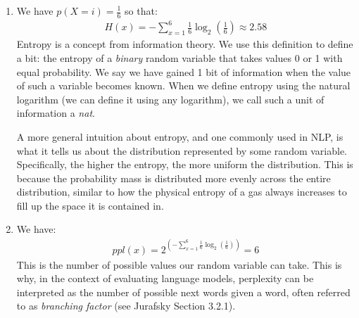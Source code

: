 \documentclass[11pt,a4paper]{article}
\begin{document}
\begin{enumerate}[label=(\alph*)]
    \item We have $p(X = i) = \frac{1}{6}$ so that:
          \begin{align*}
              H(x) = -\sum_{x=1}^6 \frac{1}{6}\log_2\left(\frac{1}{6}\right) \approx 2.58
          \end{align*}
          Entropy is a concept from information theory.
          We use this definition to define a bit: the entropy of a \emph{binary}
          random variable that takes values 0 or 1 with equal probability.
          We say we have gained 1 bit of information when the value of such a
          variable becomes known.
          When we define entropy using the natural logarithm (we can define it
          using any logarithm), we call such a unit of information a \emph{nat}.

          A more general intuition about entropy, and one commonly used in NLP,
          is what it tells us about the distribution represented by some random
          variable.
          Specifically, the higher the entropy, the more uniform the
          distribution.
          This is because the probability mass is distributed more evenly across
          the entire distribution, similar to how the physical entropy of a gas
          always increases to fill up the space it is contained in.
    \item We have:
          \begin{align*}
              ppl(x) = 2^{\left(-\sum_{x=1}^6 \frac{1}{6}\log_2\left(\frac{1}{6}\right)\right)} = 6
          \end{align*}
          This is the number of possible values our random variable can take.
          This is why, in the context of evaluating language models, perplexity
          can be interpreted as the number of possible next words given a word,
          often referred to as \emph{branching factor} (see Jurafsky Section
          3.2.1).


\end{enumerate}
\end{document}
